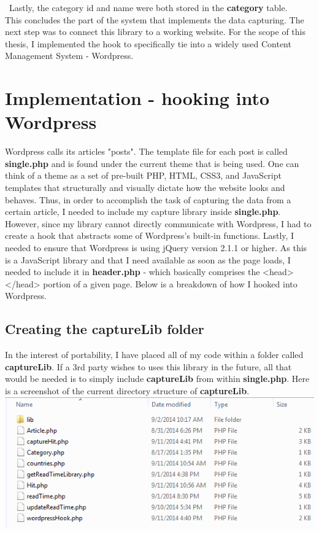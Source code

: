 \documentclass[12pt]{article}
\begin{document}
\noindent\ Lastly, the category id and name were both stored in the \textbf{category} table. \\

This concludes the part of the system that implements the data capturing. The next step was to connect this library to a working website. For the scope of this thesis, I implemented the hook to specifically tie into a widely used Content Management System - Wordpress. 

\vfill

\section{Implementation - hooking into Wordpress}
Wordpress calls its articles "posts". The template file for each post is called \textbf{single.php} and is found under the current theme that is being used. One can think of a theme as a set of pre-built PHP, HTML, CSS3, and JavaScript templates that structurally and visually dictate how the website looks and behaves. Thus, in order to accomplish the task of capturing the data from a certain article, I needed to include my capture library inside \textbf{single.php}. However, since my library cannot directly communicate with Wordpress, I had to create a hook that abstracts some of Wordpress's built-in functions. Lastly, I needed to ensure that Wordpress is using jQuery version 2.1.1 or higher. As this is a JavaScript library and that I need available as soon as the page loads, I needed to include it in \textbf{header.php} - which basically comprises the <head></head> portion of a given page. Below is a breakdown of how I hooked into Wordpress.
\subsection{Creating the captureLib folder}
In the interest of portability, I have placed all of my code within a folder called \textbf{captureLib}. If a 3rd party wishes to uses this library in the future, all that would be needed is to simply include \textbf{captureLib} from within \textbf{single.php}. Here is a screenshot of the current directory structure of \textbf{captureLib}. \\

\noindent\includegraphics[scale=0.8]{img/capturelib}    
\end{document}
